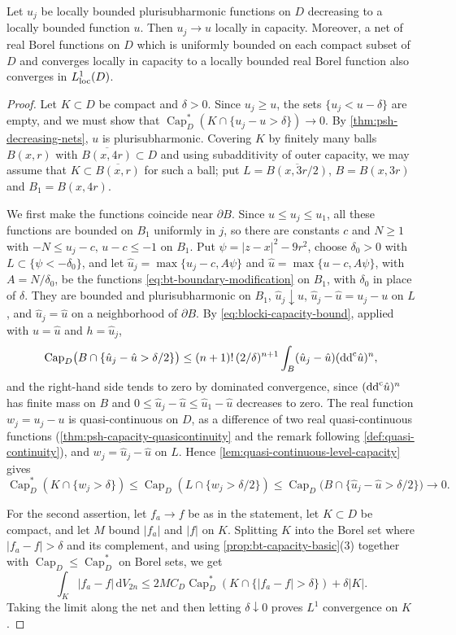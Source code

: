 \begin{proposition}\label{prop:psh-decreasing-capacity}
Let $u_j$ be locally bounded plurisubharmonic functions on $D$ decreasing to a locally bounded function $u$. Then $u_j\to u$ locally in capacity. Moreover, a net of real Borel functions on $D$ which is uniformly bounded on each compact subset of $D$ and converges locally in capacity to a locally bounded real Borel function also converges in $L^1_{\mathrm{loc}}(D)$.
\end{proposition}
\begin{proof}
Let $K\subset D$ be compact and $\delta>0$. Since $u_j\ge u$, the sets $\{u_j<u-\delta\}$ are empty, and we must show that $\operatorname{Cap}^*_D(K\cap\{u_j-u>\delta\})\to0$. By \cref{thm:psh-decreasing-nets}, $u$ is plurisubharmonic. Covering $K$ by finitely many balls $B(x,r)$ with $\overline{B(x,4r)}\subset D$ and using subadditivity of outer capacity, we may assume that $K\subset\overline{B(x,r)}$ for such a ball; put $L=\overline{B(x,3r/2)}$, $B=B(x,3r)$ and $B_1=B(x,4r)$.

We first make the functions coincide near $\partial B$. Since $u\le u_j\le u_1$, all these functions are bounded on $B_1$ uniformly in $j$, so there are constants $c$ and $N\ge1$ with $-N\le u_j-c,\,u-c\le-1$ on $B_1$. Put $\psi=|z-x|^2-9r^2$, choose $\delta_0>0$ with $L\subset\{\psi<-\delta_0\}$, and let $\hat u_j=\max\{u_j-c,A\psi\}$ and $\hat u=\max\{u-c,A\psi\}$, with $A=N/\delta_0$, be the functions \eqref{eq:bt-boundary-modification} on $B_1$, with $\delta_0$ in place of $\delta$. They are bounded and plurisubharmonic on $B_1$, $\hat u_j\downarrow\hat u$, $\hat u_j-\hat u=u_j-u$ on $L$, and $\hat u_j=\hat u$ on a neighborhood of $\partial B$. By \eqref{eq:blocki-capacity-bound}, applied with $u=\hat u$ and $h=\hat u_j$,
\[
 \operatorname{Cap}_D\bigl(B\cap\{\hat u_j-\hat u>\delta/2\}\bigr)
 \le(n+1)!\,(2/\delta)^{n+1}\int_B(\hat u_j-\hat u)(\mathrm{dd}^{\mathrm{c}}\hat u)^n,
\]
and the right-hand side tends to zero by dominated convergence, since $(\mathrm{dd}^{\mathrm{c}}\hat u)^n$ has finite mass on $B$ and $0\le\hat u_j-\hat u\le\hat u_1-\hat u$ decreases to zero. The real function $w_j=u_j-u$ is quasi-continuous on $D$, as a difference of two real quasi-continuous functions (\cref{thm:psh-capacity-quasicontinuity} and the remark following \cref{def:quasi-continuity}), and $w_j=\hat u_j-\hat u$ on $L$. Hence \cref{lem:quasi-continuous-level-capacity} gives
\[
 \operatorname{Cap}^*_D(K\cap\{w_j>\delta\})\le\operatorname{Cap}_D(L\cap\{w_j>\delta/2\})\le\operatorname{Cap}_D\bigl(B\cap\{\hat u_j-\hat u>\delta/2\}\bigr)\longrightarrow0.
\]

For the second assertion, let $f_a\to f$ be as in the statement, let $K\subset D$ be compact, and let $M$ bound $|f_a|$ and $|f|$ on $K$. Splitting $K$ into the Borel set where $|f_a-f|>\delta$ and its complement, and using \cref{prop:bt-capacity-basic}(3) together with $\operatorname{Cap}_D\le\operatorname{Cap}^*_D$ on Borel sets, we get
\[
 \int_K|f_a-f|\,\mathrm{d}V_{2n}
 \le 2MC_D\operatorname{Cap}_D^*(K\cap\{|f_a-f|>\delta\})
          +\delta|K|.
\]
Taking the limit along the net and then letting $\delta\downarrow0$ proves $L^1$ convergence on $K$.
\end{proof}

